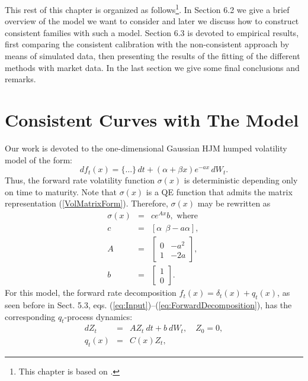 This rest of this chapter is organized as follows\footnote{This
  chapter is based on \cite{FNN:2011,FNN:2008}.}. In Section 6.2 we
give a brief overview of the model we want to consider and later we
discuss how to construct consistent families with such a
model. Section 6.3 is devoted to empirical results, first comparing
the consistent calibration with the non-consistent approach by means
of simulated data, then presenting 
the results of the fitting of the different methods with market data.
In the last section we give some final conclusions and
remarks. \section{Consistent Curves with The Model} Our work is devoted to the
one-dimensional Gaussian HJM humped 
volatility model of the form:
\begin{equation}
\label{HVHJMM}
df_t(x)=\{ \dots \}\,dt+ \left( \alpha + \beta x \right) e^{-a x}\,dW_t.
\end{equation}
Thus, the forward rate volatility function $\sigma(x)$ is
deterministic depending only on time to maturity.
Note that $\sigma(x)$ is a QE function that admits the matrix
representation (\ref{VolMatrixForm}). Therefore, $\sigma(x)$ may be
rewritten as 
\begin{eqnarray}
\label{eq:HVTSVMatrix}
\sigma(x)& = & ce^{A x} b, \text{ where } \\
\nonumber 
c& =& [\alpha~~\beta-a\alpha],\\
\nonumber
 A& =& \left[\begin{array}{cc}
0  & -a^2 \\
1  & -2a
\end{array}\right],\\
\nonumber
 b & = & \left[\begin{array}{c}
1\\
0
\end{array}\right].
\end{eqnarray}
For this model, the forward rate decomposition
$f_t(x)=\delta_t(x)+q_t(x)$, as seen before in Sect. 5.3,
eqs. (\ref{eq:Input})--(\ref{eq:ForwardDecomposition}), has
the corresponding $q_t$-process dynamics: 
\begin{eqnarray}
\label{eq:HVFactor}
dZ_t & = & A Z_t\:dt+b\:dW_t,\quad Z_0=0,\\
q_t(x) & = & C(x)Z_t,
\end{eqnarray}
